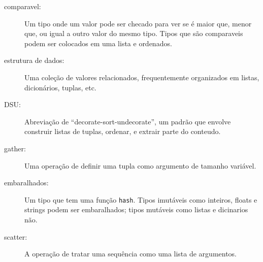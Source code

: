 \begin{description}

\item[comparavel:] Um tipo onde um valor pode ser checado para ver se é
maior que, menor que, ou igual a outro valor do mesmo tipo.
Tipos que são comparaveis podem ser colocados em uma lista e ordenados.

\item[estrutura de dados:] Uma coleção de valores relacionados, 
frequentemente organizados em listas, dicionários, tuplas, etc.

\item[DSU:] Abreviação de ``decorate-sort-undecorate'', um
padrão que envolve construir listas de tuplas, ordenar, e 
extrair parte do conteudo.

\item[gather:] Uma operação de definir uma tupla como argumento 
de tamanho variável.

\item[embaralhados:] Um tipo que tem uma função {\tt hash}. Tipos imutáveis
como inteiros, floats e strings podem ser embaralhados; tipos mutáveis como
listas e dicinarios não.

\item[scatter:] A operação de tratar uma sequência como uma lista de
argumentos.


\end{description}
